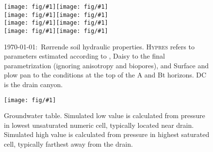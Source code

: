 \documentclass[a4paper]{article}
\newcommand{\figl}{\hspace*{-2cm}}
\newcommand{\figright}[1]{\texttt{[image: fig/\#1]}}
\newcommand{\fig}[1]{\figl\figright{#1}}
\newcommand{\Hypres}{\textsc{Hypres}}
\newcommand{\MyID}{\today:~}
\begin{document}
\begin{figure}[htbp] 
  \fig{Rorrende-Ap-Theta}\figright{Rorrende-Ap-K}\\
  \fig{Rorrende-Bt-Theta}\figright{Rorrende-Bt-K}\\
  \fig{Rorrende-C-Theta}\figright{Rorrende-C-K}\\
  \fig{Rorrende-DC-Theta}\figright{Rorrende-DC-K}
  \caption{\MyID{}R{\o}rrende soil hydraulic properties.  \Hypres{} refers to
    parameters estimated according to \citet{hypres}, Daisy to the
    final parametrization (ignoring anisotropy and biopores), and
    Surface and plow pan to the conditions at the top of the A and Bt
    horizons.  DC is the drain canyon.}
  \label{fig:Rorrende-hor}
\end{figure}

\begin{figure}[htbp]
  \begin{center}
    \fig{gwt}
  \end{center}
  \caption{Groundwater table.  Simulated low value is calculated from
    pressure in lowest unsaturated numeric cell, typically located
    near drain.  Simulated high value is calculated from pressure in
    highest saturated cell, typically farthest away from the drain.}
  \label{fig:gw}
\end{figure}

\pagestyle{empty}

\end{document}

